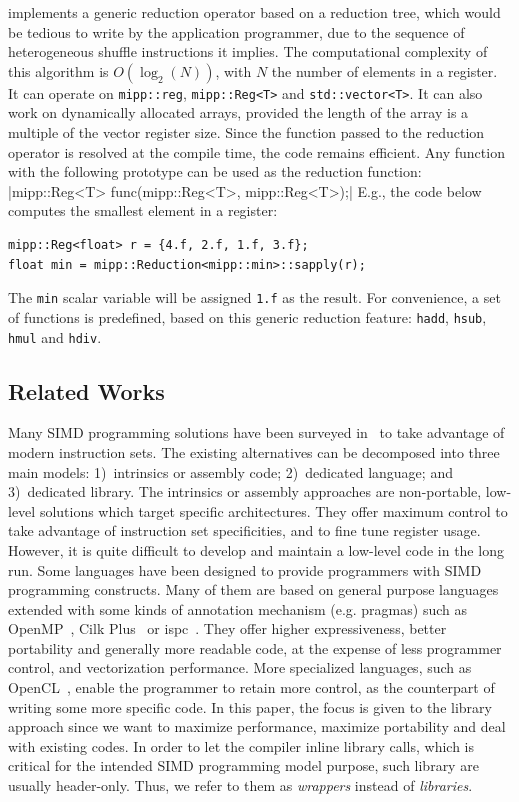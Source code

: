 \MIPP implements a generic reduction operator based on a reduction tree, which
would be tedious to write by the application programmer, due to the sequence of
heterogeneous shuffle instructions it implies. The computational complexity of
this algorithm is $O(\log_2(N))$, with $N$ the number of elements in a register.
It can operate on \verb|mipp::reg|, \verb|mipp::Reg<T>| and
\verb|std::vector<T>|. It can also work on dynamically allocated arrays,
provided the length of the array is a multiple of the vector register size.
Since the function passed to the reduction operator is resolved at the compile
time, the code remains efficient. Any function with the following prototype can
be used as the reduction function:
|mipp::Reg<T> func(mipp::Reg<T>, mipp::Reg<T>);|
{\noindent
E.g., the code below computes the smallest element in a register:
}
\begin{verbatim}
mipp::Reg<float> r = {4.f, 2.f, 1.f, 3.f};
float min = mipp::Reduction<mipp::min>::sapply(r);
\end{verbatim}
The \verb|min| scalar variable will be assigned \verb|1.f| as the result. For
convenience, a set of functions is predefined, based on this generic reduction
feature: \verb|hadd|, \verb|hsub|, \verb|hmul| and \verb|hdiv|.

\subsection{Related Works}

Many SIMD programming solutions have been surveyed in~\cite{Pohl2016} to take
advantage of modern instruction sets. The existing alternatives can be
decomposed into three main models: 1)~intrinsics or assembly code; 2)~dedicated
language; and 3)~dedicated library. The intrinsics or assembly approaches are
non-portable, low-level solutions which target specific architectures. They
offer maximum control to take advantage of instruction set specificities, and to
fine tune register usage. However, it is quite difficult to develop and maintain
a low-level code in the long run. Some languages have been designed to provide
programmers with SIMD programming constructs. Many of them are based on general
purpose languages extended with some kinds of annotation mechanism (e.g.
pragmas) such as OpenMP~\cite{OpenMP2013}, Cilk Plus~\cite{Robison2013} or
ispc~\cite{Pharr2012}. They offer higher expressiveness, better portability and
generally more readable code, at the expense of less programmer control, and
vectorization performance. More specialized languages, such as
OpenCL~\cite{Howes2015}, enable the programmer to retain more control, as the
counterpart of writing some more specific code.
In this paper, the focus is given to the library approach since we want to
maximize performance, maximize portability and deal with existing \Cxx codes. In
order to let the compiler inline library calls, which is critical for the
intended SIMD programming model purpose, such library are usually header-only.
Thus, we refer to them as \textit{wrappers} instead of \textit{libraries}.

